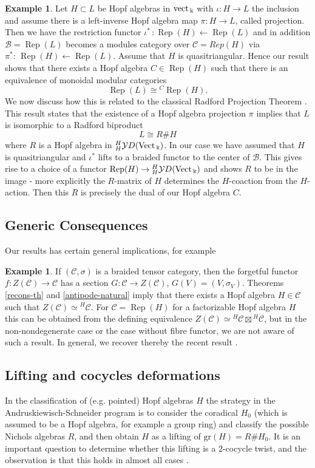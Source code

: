 \documentclass[11pt]{amsart}
\newcommand{\vc}{{\mathcal C}}
\newcommand{\Bc}{{\mathcal B}}
\newcommand{\YD}{{\mathcal YD}}
\newcommand{\ku}{{\Bbbk}}
\newcommand{\Vect}{\mbox{\rm Vect\,}}
\newcommand{\vect}{\mbox{\rm vect\,}}
\newcommand\Rep{\operatorname{Rep}}
\renewcommand{\_}[1]{\mbox{$_{\left( #1 \right)}$}}
\theoremstyle{plain}
\numberwithin{equation}{section}
\theoremstyle{definition}
\newtheorem{exa}[teo]{Example}
\theoremstyle{remark}
\theoremstyle{introTheorems}
\begin{document}
\begin{exa}
Let $H\subset L$ be Hopf algebras in $\vect_\ku$ with $\iota:H\to L$ the inclusion and assume there is a left-inverse Hopf algebra map $\pi:H\rightarrow L$, called projection. Then we have the restriction functor $\iota^*\,:\Rep(H)\leftarrow \Rep(L)$ and in addition $\Bc=\Rep(L)$ becomes a modules category over $\vc=Rep(H)$ via $\pi^*:\,\Rep(H)\leftarrow \Rep(L)$. Assume that $H$ is quasitriangular. Hence our result shows that there exists a Hopf algebra $C\in \Rep(H)$ such that there is an equivalence of monoidal modular categories
$$\Rep(L)\cong {^C}\Rep(H).$$ 
We now discuss how this is related to the classical Radford Projection Theorem \cite{Rad85}. This result states that the existence of a Hopf algebra projection $\pi$ implies that $L$ is isomorphic to a Radford biproduct $$L\cong R\# H$$
where $R$ is a Hopf algebra in ${^H_H}\YD(\Vect_\ku)$. In our case we have assumed that $H$ is quasitriangular  and $\iota^*$ lifts to a braided functor to the center of $\Bc$. This gives rise to a choice of a functor $\Rep(H)\to {^H_H}\YD(\Vect_\ku)$ and shows $R$ to be in the image - more explicitly the $R$-matrix of $H$ determines the $H$-coaction from the $H$-action. Then this $R$ is precisely the dual of our Hopf algebra $C$.
\end{exa}

\subsection{Generic Consequences}

Our results has certain general implications, for example

\begin{exa}
If $(\vc, \sigma)$ is a braided tensor category, then the forgetful functor $f:Z(\vc)\to \vc$ has a section $G:\vc\to Z(\vc)$, $G(V)=(V, \sigma_V)$. Theorems \ref{recons-th} and  \ref{antipode-natural} imply that there exists a Hopf algebra $H\in \vc$ such that $Z(\vc)\simeq {}^H\vc$. For $\vc=\Rep(H)$ for a factorizable Hopf algebra $H$ this can be obtained from the defining equivalence  $Z(\vc)\simeq {}^H\vc\boxtimes {}^H\vc$, but in the non-nondegenerate case or the case without fibre functor, we are not aware of such a result. In general, we recover thereby the recent result \cite{LZ23}.
\end{exa}

\subsection{Lifting and cocycles deformations}
In the classification of (e.g. pointed) Hopf algebras $H$ the strategy in the Andruskiewisch-Schneider program \cite{AS10} is to consider the coradical $H_0$ (which is assumed to be a Hopf algebra, for example a group ring) and classify the possible Nichols algebras $R$, and then obtain $H$ as a lifting of $\mathrm{gr}(H)=R\#H_0$. It is an important question to determine whether this lifting is a $2$-cocycle twist, and the observation is that this holds in almost all cases \cite{AGI19}. \\
\end{document}
